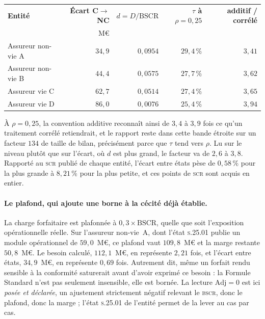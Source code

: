 \begin{center}\small
\renewcommand{\arraystretch}{1.25}
\begin{tabular}{@{}l r r r r@{}}
\toprule
\textbf{Entité} & \textbf{Écart C$\to$NC} & \textbf{$d = D/\mathrm{BSCR}$} &
\textbf{$\tau$ à $\rho = 0{,}25$} & \textbf{additif / corrélé} \\
 & M\euro & & & \\
\midrule
Assureur non-vie A & $34{,}9$ & $0{,}0954$ & $29{,}4\,\%$ & $3{,}41$ \\
Assureur non-vie B & $44{,}4$ & $0{,}0575$ & $27{,}7\,\%$ & $3{,}62$ \\
Assureur vie C & $62{,}7$ & $0{,}0514$ & $27{,}4\,\%$ & $3{,}65$ \\
Assureur vie D & $86{,}0$ & $0{,}0076$ & $25{,}4\,\%$ & $3{,}94$ \\
\bottomrule
\end{tabular}
\end{center}

\vspace{2pt}
\noindent À $\rho = 0{,}25$, la convention additive reconnaît ainsi de $3{,}4$ à $3{,}9$ fois ce
qu'un traitement corrélé retiendrait, et le rapport reste dans cette bande étroite sur un facteur
$134$ de taille de bilan, précisément parce que $\tau$ tend vers $\rho$. Lu sur le niveau plutôt
que sur l'écart, où $d$ est plus grand, le facteur va de $2{,}6$ à $3{,}8$. Rapporté au
\textsc{scr} publié de chaque entité, l'écart entre états pèse de $0{,}58\,\%$ pour la plus grande
à $8{,}21\,\%$ pour la plus petite, et ces points de \textsc{scr} sont acquis en entier.

\paragraph{Le plafond, qui ajoute une borne à la cécité déjà établie.} La charge forfaitaire est
plafonnée à $0{,}3 \times \mathrm{BSCR}$, quelle que soit l'exposition opérationnelle réelle. Sur
l'assureur non-vie~A, dont l'état \textsc{s.25.01} publie un module opérationnel de
$59{,}0$~M\euro, ce plafond vaut $109{,}8$~M\euro{} et la marge restante $50{,}8$~M\euro. Le
besoin calculé, $112{,}1$~M\euro, en représente $2{,}21$ fois, et l'écart entre états,
$34{,}9$~M\euro, en représente $0{,}69$ fois. Autrement dit, même un forfait rendu
sensible à la conformité saturerait avant d'avoir exprimé ce besoin : la Formule Standard n'est
pas seulement insensible, elle est bornée. La lecture $\mathrm{Adj} = 0$ est ici \emph{posée et
déclarée}, un ajustement strictement négatif relevant le \textsc{bscr}, donc le plafond, donc la
marge ; l'état \textsc{s.25.01} de l'entité permet de la lever au cas par cas.

